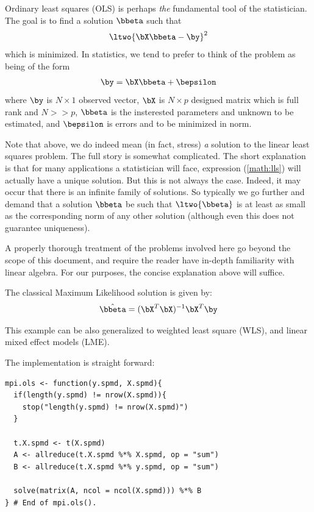 Ordinary least squares (OLS)
is perhaps \emph{the} fundamental tool of the statistician.  The goal is to find a solution $\bbeta$ such that
\begin{align}
\ltwo{ \bX\bbeta - \by }^2 \label{math:lls}
\end{align}
which is minimized.  In statistics, we tend to prefer to think of the problem as being of the form
\begin{align}
\by = \bX\bbeta + \bepsilon \label{math:statslls}
\end{align}
where $\by$ is $N\times 1$ observed vector,
$\bX$ is $N\times p$ designed matrix which is full rank and $N >> p$,
$\bbeta$ is the insterested parameters and unknown to be estimated,
and $\bepsilon$ is errors and to be minimized in norm.

Note that above, we do indeed mean (in fact, stress) \emph{a} solution to the linear least squares problem.  The full story is somewhat complicated.  The short explanation is that for many applications a statistician will face, expression (\ref{math:lls}) will actually have a unique solution.  But this is not always the case.  Indeed, it may occur that there is an infinite family of solutions.  So typically we go further and demand that a solution $\bbeta$ be such that $\ltwo{\bbeta}$ is at least as small as the corresponding norm of any other solution (although even this does not guarantee uniqueness).

A properly thorough treatment of the problems involved here go beyond the scope of this document, and require the reader have in-depth familiarity with linear algebra.  For our purposes, the concise explanation above will suffice.

The classical Maximum Likelihood solution is given by:
\begin{align}
 \hat{\bbeta} = (\bX^T\bX)^{-1}\bX^T\by \label{math:ols}
\end{align}
 
This example can be also generalized to weighted least square (WLS),
and linear mixed effect models (LME).

The implementation is straight forward:
\begin{lstlisting}[language=rr,title=R Code]
mpi.ols <- function(y.spmd, X.spmd){
  if(length(y.spmd) != nrow(X.spmd)){
    stop("length(y.spmd) != nrow(X.spmd)")
  }

  t.X.spmd <- t(X.spmd)
  A <- allreduce(t.X.spmd %*% X.spmd, op = "sum")
  B <- allreduce(t.X.spmd %*% y.spmd, op = "sum")

  solve(matrix(A, ncol = ncol(X.spmd))) %*% B
} # End of mpi.ols().

\end{lstlisting}

